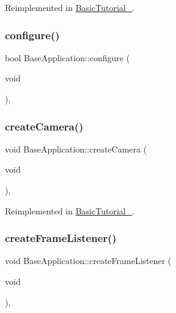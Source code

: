 Reimplemented in \mbox{\hyperlink{class_basic_tutorial__00_aba97a29d983586d2dc8e108d3bccf721}{Basic\+Tutorial\+\_}}.

\mbox{\label{class_base_application_a62ed46f90e9f82cc810997647a2c587e}} 
\subsubsection{\texorpdfstring{configure()}{configure()}}
{\footnotesize\ttfamily bool Base\+Application\+::configure (\begin{DoxyParamCaption}\item[{void}]{ }\end{DoxyParamCaption})\hspace{0.3cm}{\ttfamily [protected]}, {\ttfamily [virtual]}}

\mbox{\label{class_base_application_afa9d51527763cf9aee9cd4e1b1039d55}} 
\subsubsection{\texorpdfstring{create\+Camera()}{createCamera()}}
{\footnotesize\ttfamily void Base\+Application\+::create\+Camera (\begin{DoxyParamCaption}\item[{void}]{ }\end{DoxyParamCaption})\hspace{0.3cm}{\ttfamily [protected]}, {\ttfamily [virtual]}}



Reimplemented in \mbox{\hyperlink{class_basic_tutorial__00_a1bf709417d654dffc2ea10987412b912}{Basic\+Tutorial\+\_}}.

\mbox{\label{class_base_application_aff6fd9ff1ff0978cc68f19dd65be4778}} 
\subsubsection{\texorpdfstring{create\+Frame\+Listener()}{createFrameListener()}}
{\footnotesize\ttfamily void Base\+Application\+::create\+Frame\+Listener (\begin{DoxyParamCaption}\item[{void}]{ }\end{DoxyParamCaption})\hspace{0.3cm}{\ttfamily [protected]}, {\ttfamily [virtual]}}

